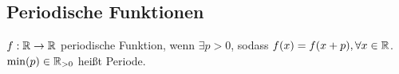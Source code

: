 \subsection*{Periodische Funktionen}
$f: \mathbb R \rightarrow \mathbb R$ periodische Funktion, wenn $\exists p > 0$, sodass $f(x) = f(x + p), \forall x \in \mathbb R$.\\
$\min(p) \in \mathbb R_{>0}$ heißt Periode.
